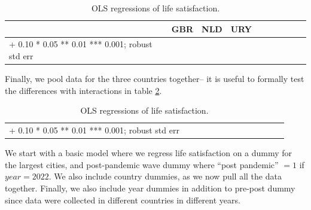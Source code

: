 \documentclass[10pt, letterpaper]{article}
\begin{document}
\begin{spacing}{1.4}
\begin{spacing}{.9} \begin{table}[H]\centering   \begin{scriptsize} \begin{tabular}{p{1.8in}p{.5in}p{.5in}|p{.5in}p{.5in}|p{.5in}p{.5in}|p{.5in}p{.5in}p{.5in}p{.5 in}p{.5in}p{.5 in}}\hline\hline&\multicolumn{2}{c}{GBR}&\multicolumn{2}{c}{NLD}&\multicolumn{2}{c}{URY}\\  \hline + 0.10 * 0.05 ** 0.01 *** 0.001; robust std err \end{tabular}\end{scriptsize}\caption{\label{c}OLS regressions of life satisfaction.}\end{table} \end{spacing}



Finally, we pool data for the three countries together--
it is useful to formally test the differences with interactions in table \ref{d}.




\begin{spacing}{.9} \begin{table}[H]\centering   \begin{scriptsize} \begin{tabular}{p{1.8in}p{.5in}p{.5in}p{.5in}p{.5in}p{.5in}p{.5in}p{.5in}p{.5in}p{.5in}p{.5 in}p{.5in}p{.5 in}}\hline  \hline + 0.10 * 0.05 ** 0.01 *** 0.001; robust std err \end{tabular}\end{scriptsize}\caption{\label{d}OLS regressions of life satisfaction.}\end{table} \end{spacing}

 We start with a basic model where we regress life satisfaction on a dummy for the largest cities, and post-pandemic wave dummy where ``post pandemic'' $=1$ if $year=2022$. We also include country dummies, as we now pull all the data together. Finally, we also include year dummies in addition to pre-post dummy since data were collected in different countries in different years. 


\end{spacing}
\end{document}
